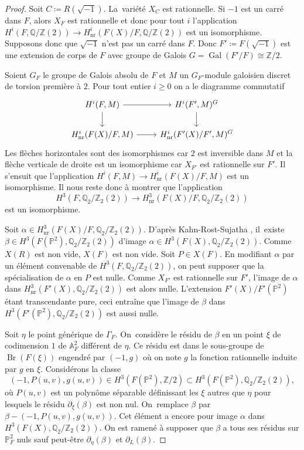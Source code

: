 \documentclass[JEP,XML,SOM,Unicode,francais,published]{cedram}
\theoremstyle{definition}
\newcommand{\Q}{\mathbb Q}
\newcommand{\Z}{\mathbb Z}
\newcommand{\A}{\mathbb A}
\renewcommand{\P}{\mathbb P}
\newcommand{\Br}{\operatorname{Br}}
\newcommand{\on}[1]{\operatorname{#1}}
\begin{document}
\begin{proof}
Soit $C\coloneqq R(\sqrt{-1})$. La~variété $X_{C}$ est rationnelle. Si $-1$ est un carré dans $F$, alors $X_F$ est rationnelle et donc pour tout $i$ l'application $H^i(F,\Q/\Z(2)) \to H^i_{\on{nr}}(F(X)/F,\Q/\Z(2))$ est un isomorphisme. Supposons donc que $\sqrt{-1}$ n'est pas un carré dans $F$. Donc $F'\coloneqq F(\sqrt{-1})$ est une extension de corps de $F$ avec groupe de Galois $G=\on{Gal}(F'/F)\cong \Z/2$.

Soient $G_F$ le groupe de Galois absolu de $F$ et $M$ un $G_F$-module galoisien discret de torsion première à $2$. Pour tout entier $i\geq 0$ on a le diagramme commutatif
\[
\begin{tikzcd}
H^i(F,M) \arrow[r]\arrow[d] & H^i(F',M)^G\arrow[d] \\
H^i_{\on{nr}}(F(X)/F,M) \arrow[r] & H^i_{\on{nr}}(F'(X)/F',M)^G
\end{tikzcd}
\]
Les flèches horizontales sont des isomorphismes car $2$ est inversible dans $M$ et la flèche verticale de droite est un isomorphisme car $X_{F'}$ est rationnelle sur $F'$. Il s'ensuit que l'application $H^i(F,M)\to H^i_{\on{nr}}(F(X)/F,M)$ est un isomorphisme.
Il nous reste donc à montrer que l'application \[H^3(F,\Q_2/\Z_2(2))\to H^3_{\on{nr}}(F(X)/F,\Q_2/\Z_2(2))\]
est un isomorphisme.

Soit $\alpha \in H^3_{\on{nr}}(F(X)/F,\Q_2/\Z_2(2))$. D'après Kahn-Rost-Sujatha \cite[Th.\,5]{kahn1998unramified}, il~existe $\beta \in H^3(F(\P^2), \Q_2/\Z_2(2))$ d'image $\alpha \in H^3(F(X),\Q_2/\Z_2(2))$. Comme $X(R)$ est non vide, $X(F)$ est non vide. Soit $P\in X(F)$. En modifiant $\alpha$ par un élément convenable de $H^3(F,\Q_2/\Z_2(2))$, on peut supposer que la spécialisation de $\alpha$ en $P$ est nulle. Comme $X_{F'}$ est rationnelle sur $F'$, l'image de $\alpha$ dans $H^3_{\on{nr}}(F'(X),\Q_2/\Z_2(2))$ est alors nulle. L'extension $F'(X)/F'(\P^2)$ étant transcendante pure, ceci entraîne que l'image de $\beta$ dans $H^3(F'(\P^2), \Q_2/\Z_2(2))$ est aussi nulle.

Soit $\eta$ le point générique de $\Gamma_F$. On~considère le résidu de $\beta$ en un point $\xi$
de codimension $1$ de $\A^2_{F}$ différent de $\eta$. Ce résidu est dans le sous-groupe de $\Br(F(\xi))$ engendré par $(-1,g)$ où on note $g$ la fonction rationnelle
induite par $g$ en $\xi$. Considérons la classe
\[(-1,P(u,v),g(u,v)) \in H^3(F(\P^2), \Z/2) \subset H^3(F(\P^2), \Q_2/\Z_2(2)),\]
où $P(u,v)$ est un polynôme séparable définissant
les $\xi$ autres que $\eta$ pour lesquels le résidu $\partial_{\xi}(\beta)$
est non nul. On~remplace $\beta$ par $\beta - (-1,P(u,v),g(u,v))$.
Cet élément a encore pour image $\alpha$ dans $H^3(F(X),\Q_2/\Z_2(2))$.
On est ramené à supposer que $\beta$ a tous ses résidus
sur $\P^2_{F}$ nuls sauf peut-être $\partial_{\eta}(\beta)$
et $\partial_{L}(\beta)$.


\end{proof}
\end{document}

